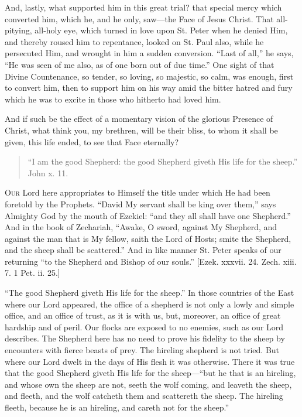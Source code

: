 And, lastly, what supported him in this great trial? that special
mercy which converted him, which he, and he only, saw—the Face of
Jesus Christ. That all-pitying, all-holy eye, which turned in love
upon St. Peter when he denied Him, and thereby roused him to
repentance, looked on St. Paul also, while he persecuted Him, and
wrought in him a sudden conversion. ``Last of all,'' he says,
``He was seen of me also, as of one born out of due time.''
One sight of that Divine Countenance, so tender, so loving, so
majestic, so calm, was enough, first to convert him, then to support
him on his way amid the bitter hatred and fury which he was to excite
in those who hitherto had loved him.

And if such be the effect of a momentary vision of the glorious
Presence of Christ, what think you, my brethren, will be their bliss,
to whom it shall be given, this life ended, to see that Face
eternally?


\begin{quote}

``I am the good Shepherd: the good Shepherd giveth His life
for the sheep.'' John x. 11.

\end{quote}

O\textsc{ur} Lord here appropriates to Himself the title under which He had
been foretold by the Prophets. ``David My servant shall be king
over them,'' says Almighty God by the mouth of Ezekiel: ``and
they all shall have one Shepherd.'' And in the book of Zechariah,
``Awake, O sword, against My Shepherd, and against the man that is
My fellow, saith the Lord of Hosts; smite the Shepherd, and the sheep
shall be scattered.'' And in like manner St. Peter speaks of our
returning ``to the Shepherd and Bishop of our souls.'' [Ezek.
xxxvii. 24. Zech. xiii. 7. 1 Pet. ii. 25.]

``The good Shepherd giveth His life for the sheep.'' In
those countries of the East where our Lord appeared, the office of a
shepherd is not only a lowly and simple office, and an office of
trust, as it is with us, but, moreover, an office of great hardship
and of peril. Our flocks are exposed to no enemies, such as our Lord
describes. The Shepherd here has no need to prove his fidelity to the
sheep by encounters with fierce beasts of prey. The hireling shepherd
is not tried. But where our Lord dwelt in the days of His flesh it was
otherwise. There it was true that the good Shepherd giveth His life
for the sheep—``but he that is an hireling, and whose own the
sheep are not, seeth the wolf coming, and leaveth the sheep, and
fleeth, and the wolf catcheth them and scattereth the sheep. The
hireling fleeth, because he is an hireling, and careth not for the
sheep.''


